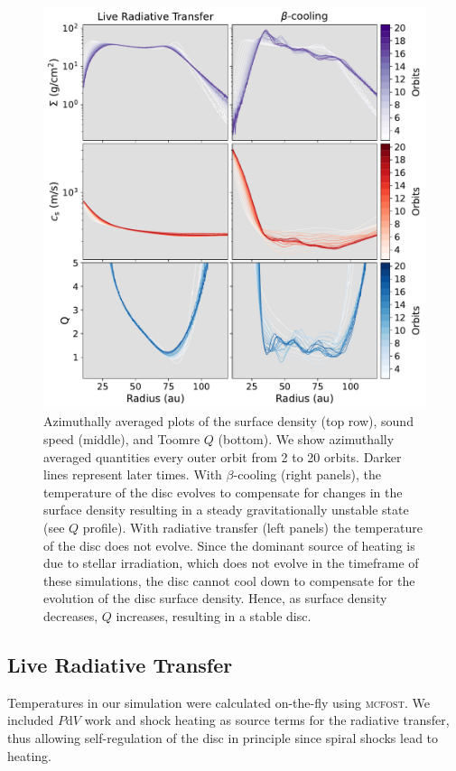 \documentclass[usenatbib]{mnras}
\begin{document}
\begin{figure}
    \centering
    \includegraphics[width=\linewidth]{Q_evol_comparison.pdf}
    \caption{Azimuthally averaged plots of the surface density (top row), sound speed (middle), and Toomre $Q$ (bottom). We show azimuthally averaged quantities every outer orbit from 2 to 20 orbits. Darker lines represent later times. With $\beta$-cooling (right panels), the temperature of the disc evolves to compensate for changes in the surface density resulting in a steady gravitationally unstable state (see $Q$ profile). With radiative transfer (left panels) the temperature of the disc does not evolve. Since the dominant source of heating is due to stellar irradiation, which does not evolve in the timeframe of these simulations, the disc cannot cool down to compensate for the evolution of the disc surface density. Hence, as surface density decreases, $Q$ increases, resulting in a stable disc.
    }
    \label{fig:Q_plot}
\end{figure}


\subsection{Live Radiative Transfer}
\label{sec:LRT}

Temperatures in our simulation were calculated on-the-fly using  \textsc{mcfost}.
We included $P\mathrm{d}V$ work and shock heating as source terms for the radiative transfer, thus allowing self-regulation of the disc in principle since spiral shocks lead to heating.
\end{document}

